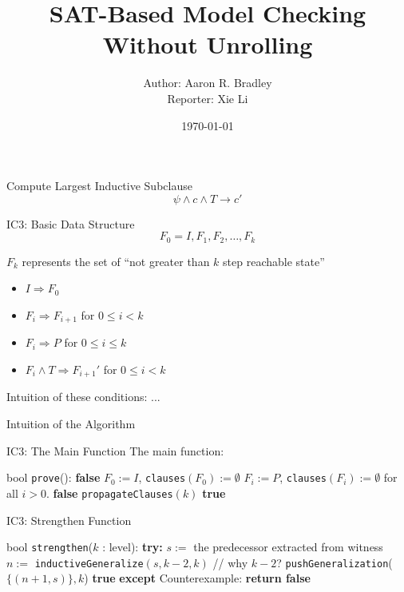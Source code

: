 \documentclass[aspectratio=1610, 13pt]{beamer}
\title{SAT-Based Model Checking Without Unrolling}
\author{Author: Aaron R. Bradley\\
Reporter:  Xie Li}
\date{\today}
\begin{document}
\maketitle

\begin{frame}{Compute Largest Inductive Subclause}
\[\psi \wedge c \wedge T \rightarrow c'\]
\vspace{5em}
\end{frame}

\begin{frame}{IC3: Basic Data Structure}
\[F_0 = I, F_1, F_2, \ldots, F_k\]


$F_k$ represents the set of ``not greater than $k$ step reachable state''

\begin{itemize}
\item $I \Rightarrow F_0$
\item $F_i\Rightarrow F_{i + 1}$
for $0\le i < k$
\item $F_i\Rightarrow P$
for $0\le i \le k$
\item $F_i\wedge T \Rightarrow F_{i + 1} '$ 
for $0\le i < k$
\end{itemize}
Intuition of these conditions: ...
\end{frame}

\begin{frame}{Intuition of the Algorithm}

\end{frame}

\begin{frame}{IC3: The Main Function}
The main function:
\begin{algorithmic}[1]
\STATE bool \texttt{prove}():
	\RETURN \textbf{false}
	\ENDIF
	\STATE $F_0 := I$, \texttt{clauses}$(F_0) := \emptyset$
	\STATE $F_i := P$, \texttt{clauses}$(F_i) := \emptyset$ for all $i > 0$.
	\RETURN  \textbf{false}
	\ENDIF
	\STATE \texttt{propagateClauses}$(k)$
	\RETURN \textbf{true}
	\ENDIF
	\ENDFOR
\end{algorithmic}
\end{frame}

\begin{frame}{IC3: Strengthen Function}

\begin{algorithmic}[1]
\STATE bool \texttt{strengthen}($k$ : level):
\STATE \textbf{try:}
		\STATE $s:=$ the predecessor extracted from witness
		\STATE $n := $ \texttt{inductiveGeneralize}$ (s, k-2, k)$ // why $k - 2$?
		\STATE \texttt{pushGeneralization}($\{(n + 1, s)\}, k$)
	\ENDWHILE
		\RETURN \textbf{true}
\STATE \textbf{except} Counterexample:\textbf{ return false}
\end{algorithmic}
\end{frame}
\end{document}
